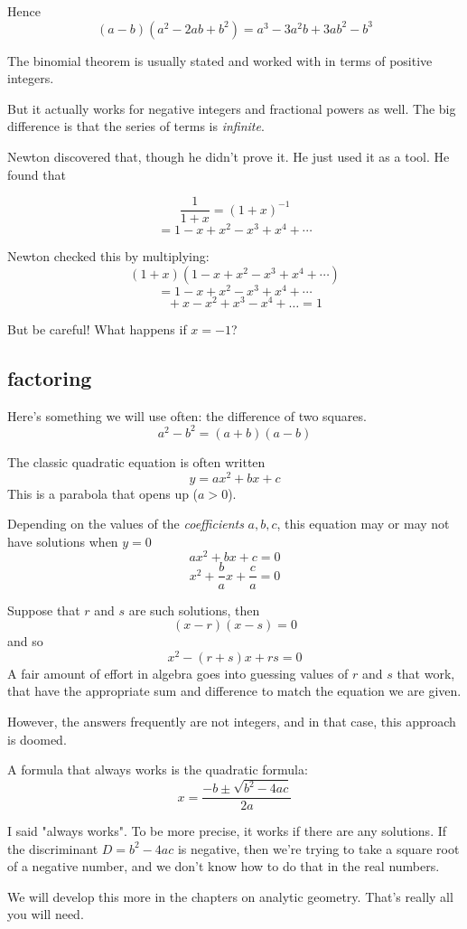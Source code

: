 \documentclass[11pt, oneside]{article}
\begin{document}
Hence
\[ (a-b)(a^2 - 2ab + b^2) = a^3 - 3a^2b + 3ab^2 - b^3 \]

The binomial theorem is usually stated and worked with in terms of positive integers.  

But it actually works for negative integers and fractional powers as well.  The big difference is that the series of terms is \emph{infinite}.

Newton discovered that, though he didn't prove it.  He just used it as a tool.  He found that

\[ \frac{1}{1 + x} = (1+x)^{-1} \]
\[ = 1 - x + x^2 - x^3 + x^4 + \cdots  \]

Newton checked this by multiplying:
\[ (1+x)(1 - x + x^2 - x^3 + x^4 + \cdots) \]
\[ = 1 - x + x^2 - x^3 + x^4 + \cdots \]
\[ \ \ \ \ \ \ \ + x - x^2 + x^3 - x^4 + \dots = 1  \]

But be careful!  What happens if $x = -1$?

\subsection*{factoring}
Here's something we will use often:  the difference of two squares.
\[ a^2 - b^2 = (a + b)(a - b) \]

The classic quadratic equation is often written
\[ y = ax^2 + bx + c \]
This is a parabola that opens up ($a > 0$).  

Depending on the values of the \emph{coefficients} $a,b,c$, this equation may or may not have solutions when $y = 0$
\[ ax^2 + bx + c = 0 \]
\[ x^2 + \frac{b}{a}x + \frac{c}{a} = 0 \]

Suppose that $r$ and $s$ are such solutions, then 
\[ (x - r)(x - s) = 0 \]
and so
\[ x^2 - (r + s)x + rs = 0 \]
A fair amount of effort in algebra goes into guessing values of $r$ and $s$ that work, that have the appropriate sum and difference to match the equation we are given.

However, the answers frequently are not integers, and in that case, this approach is doomed.  

A formula that always works is the quadratic formula:
\[ x = \frac{-b \pm \sqrt{b^2 - 4ac}}{2a} \]

I said "always works".  To be more precise, it works if there are any solutions.  If the discriminant $D = b^2 - 4ac$ is negative, then we're trying to take a square root of a negative number, and we don't know how to do that in the real numbers.

We will develop this more in the chapters on analytic geometry.  That's really all you will need.
\end{document}
